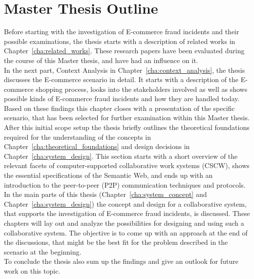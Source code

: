 
\section{Master Thesis Outline}
\label{sec:thesis_outline}

Before starting with the investigation of \gls{E-commerce} fraud incidents and their possible examinations, the thesis starts with a description of related works in Chapter~\ref{cha:related_works}. These research papers have been evaluated during the course of this Master thesis, and have had an influence on it. \\

In the next part, Context Analysis in Chapter~\ref{cha:context_analysis}, the thesis discusses the \gls{E-commerce} scenario in detail. It starts with a description of the \gls{E-commerce} shopping process, looks into the stakeholders involved as well as shows possible kinds of \gls{E-commerce} fraud incidents and how they are handled today. Based on these findings this chapter closes with a presentation of the specific scenario, that has been selected for further examination within this Master thesis. \\

After this initial scope setup the thesis briefly outlines the theoretical foundations required for the understanding of the concepts in Chapter~\ref{cha:theoretical_foundations} and design decisions in Chapter~\ref{cha:system_design}. This section starts with a short overview of the relevant facets of computer-supported collaborative work systems (\gls{CSCW}), shows the essential specifications of the Semantic Web, and ends up with an introduction to the peer-to-peer (\gls{P2P}) communication techniques and protocols. \\

In the main parts of this thesis (Chapter~\ref{cha:system_concept} and Chapter~\ref{cha:system_design}) the concept and design for a collaborative system, that supports the investigation of \gls{E-commerce} fraud incidents, is discussed. These chapters will lay out and analyze the possibilities for designing and using such a collaborative system. The objective is to come up with an approach at the end of the discussions, that might be the best fit for the problem described in the scenario at the beginning. \\

To conclude the thesis also sum up the findings and give an outlook for future work on this topic.

